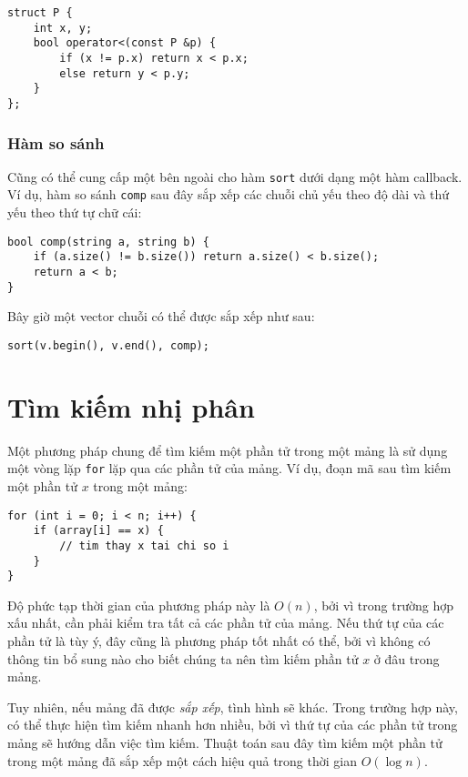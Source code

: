 \begin{lstlisting}
struct P {
    int x, y;
    bool operator<(const P &p) {
        if (x != p.x) return x < p.x;
        else return y < p.y;
    }
};
\end{lstlisting}

\subsubsection{Hàm so sánh}


Cũng có thể cung cấp một
 bên ngoài cho hàm \texttt{sort}
dưới dạng một hàm callback.
Ví dụ, hàm so sánh \texttt{comp} sau đây
sắp xếp các chuỗi chủ yếu theo độ dài và thứ yếu
theo thứ tự chữ cái:

\begin{lstlisting}
bool comp(string a, string b) {
    if (a.size() != b.size()) return a.size() < b.size();
    return a < b;
}
\end{lstlisting}
Bây giờ một vector chuỗi có thể được sắp xếp như sau:
\begin{lstlisting}
sort(v.begin(), v.end(), comp);
\end{lstlisting}

\section{Tìm kiếm nhị phân}


Một phương pháp chung để tìm kiếm một phần tử
trong một mảng là sử dụng một vòng lặp \texttt{for}
lặp qua các phần tử của mảng.
Ví dụ, đoạn mã sau tìm kiếm
một phần tử $x$ trong một mảng:

\begin{lstlisting}
for (int i = 0; i < n; i++) {
    if (array[i] == x) {
        // tim thay x tai chi so i
    }
}
\end{lstlisting}

Độ phức tạp thời gian của phương pháp này là $O(n)$,
bởi vì trong trường hợp xấu nhất, cần phải kiểm tra
tất cả các phần tử của mảng.
Nếu thứ tự của các phần tử là tùy ý,
đây cũng là phương pháp tốt nhất có thể, bởi vì
không có thông tin bổ sung nào cho biết
chúng ta nên tìm kiếm phần tử $x$ ở đâu trong mảng.

Tuy nhiên, nếu mảng đã được \emph{sắp xếp},
tình hình sẽ khác.
Trong trường hợp này, có thể thực hiện
tìm kiếm nhanh hơn nhiều, bởi vì thứ tự của các
phần tử trong mảng sẽ hướng dẫn việc tìm kiếm.
Thuật toán  sau đây
tìm kiếm một phần tử trong một mảng đã sắp xếp một cách hiệu quả
trong thời gian $O(\log n)$.

